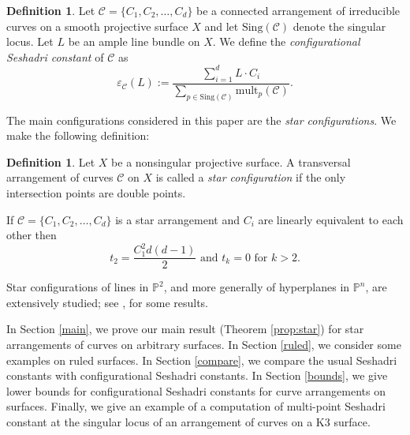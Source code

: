 \documentclass[12pt,reqno]{amsart}
\theoremstyle{plain}
\numberwithin{equation}{section}
\theoremstyle{definition}
\newtheorem{definition}[theorem]{Definition}
\begin{document}
	\begin{definition}
		Let $\mathcal{C}=\{C_1,C_2, \ldots ,C_d\}$ be a connected arrangement of irreducible curves
		on a smooth projective surface $X$ and let $\text{Sing}(\mathcal{C})$ denote the singular locus.  Let $L$ be an ample line bundle on $X$. We define the \textit{configurational Seshadri constant} of $\mathcal{C}$ as 
			$$\varepsilon_\mathcal{C}(L):= \frac{\sum\limits_{i=1}^{d}L\cdot C_i}{\sum\limits_{p \in \text{Sing}(\mathcal{C}) }\text{mult}_p(\mathcal{C})}.$$
	\end{definition}	
	

The main configurations considered in this paper are the \textit{star configurations}. We make the following definition: 
\begin{definition} Let $X$ be a nonsingular projective surface.  
A transversal arrangement of curves $\mathcal{C}$ on $X$
		 is called a \emph{star  configuration} if the only intersection points are double points.
	\end{definition}
	
If $\mathcal{C}= \{C_1,C_2, \ldots ,C_d\}$ is a star arrangement and $C_i$ are linearly equivalent to each other then $$t_2=\frac{C_1^2d(d-1)}{2}\text{ and }t_k = 0 \text{ for } k > 2.$$ 

Star configurations of lines in $\mathbb{P}^2$, and more generally of hyperplanes in $\mathbb{P}^n$, are extensively studied; 
see \cite{CV,GHM, JP}, for some results. 	
	
In Section \ref{main}, we prove our main result (Theorem \ref{prop:star}) for star arrangements of curves on arbitrary surfaces. 
In Section \ref{ruled}, we consider some examples on ruled surfaces. In Section \ref{compare}, we compare the usual Seshadri constants with configurational Seshadri constants. In Section \ref{bounds}, we give lower bounds for configurational Seshadri constants for curve arrangements on surfaces. 
Finally, we give an example of a computation of multi-point Seshadri constant at the singular locus of an arrangement of curves on a K3 surface. 
	
\end{document}
